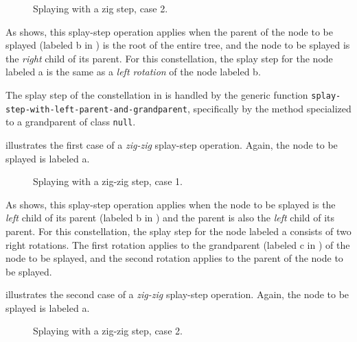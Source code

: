 \begin{figure}
\begin{center}
\end{center}
\caption{\label{fig-splay-zig-2}
Splaying with a zig step, case 2.}
\end{figure}

As  shows, this splay-step operation applies
when the parent of the node to be splayed (labeled \textsf{b} in
) is the root of the entire tree, and the node
to be splayed is the \emph{right} child of its parent.  For this
constellation, the splay step for the node labeled \textsf{a} is the
same as a \emph{left rotation} of the node labeled \textsf{b}.

The splay step of the constellation in  is
handled by the generic function
\texttt{splay-step-with-left-parent-and-grandparent}, specifically by
the method specialized to a grandparent of class \texttt{null}.

 illustrates the first case of a
\emph{zig-zig} splay-step operation.  Again, the node to be splayed is
labeled \textsf{a}.

\begin{figure}
\begin{center}
\end{center}
\caption{\label{fig-splay-zig-zig-1}
Splaying with a zig-zig step, case 1.}
\end{figure}

As  shows, this splay-step operation
applies when the node to be splayed is the \emph{left} child of its
parent (labeled \textsf{b} in ) and the
parent is also the \emph{left} child of its parent.  For this
constellation, the splay step for the node labeled \textsf{a} consists
of two right rotations.  The first rotation applies to the grandparent
(labeled \textsf{c} in ) of the node to be
splayed, and the second rotation applies to the parent of the node to
be splayed.

 illustrates the second case of a
\emph{zig-zig} splay-step operation.  Again, the node to be splayed is
labeled \textsf{a}.

\begin{figure}
\begin{center}
\end{center}
\caption{\label{fig-splay-zig-zig-2}
Splaying with a zig-zig step, case 2.}
\end{figure}

